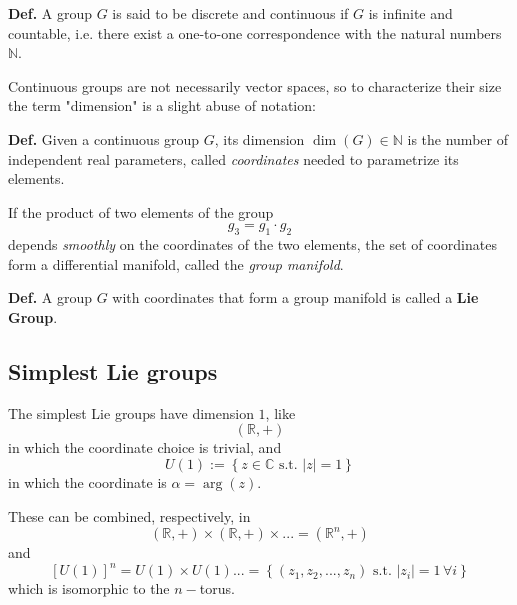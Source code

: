 \textbf{Def.} A group $G$ is said to be discrete and continuous if $G$ is infinite
and countable, i.e. there exist a one-to-one correspondence with the natural numbers
$\mathbb{N}$.

Continuous groups are not necessarily vector spaces, so to characterize their size
the term "dimension" is a slight abuse of notation:

\textbf{Def.} Given a continuous group $G$, its dimension $\dim(G)\in\mathbb{N}$
is the number of independent real parameters, called \textit{coordinates} needed
to parametrize its elements.

If the product of two elements of the group
$$g_3=g_1\cdot g_2$$
depends \textit{smoothly} on the coordinates of the two elements, the set of
coordinates form a differential manifold, called the \textit{group manifold}.

\textbf{Def.} A group $G$ with coordinates that form a group manifold is called a
\textbf{Lie Group}.
\subsection{Simplest Lie groups}
The simplest Lie groups have dimension $1$, like
$$(\mathbb{R},+)$$
in which the coordinate choice is trivial, and
$$U(1) := \left\{z\in\mathbb{C} \text{ s.t. }|z|=1\right\}$$
in which the coordinate is $\alpha=\arg(z)$.

These can be combined, respectively, in
$$(\mathbb{R},+)\times(\mathbb{R},+)\times... = (\mathbb{R}^n,+)$$
and
$$[U(1)]^n=U(1)\times U(1)...=\left\{(z_1,z_2,...,z_n)\text{ s.t. }|z_i|=1\,\forall
i\right\}$$
which is isomorphic to the $n-$torus.
